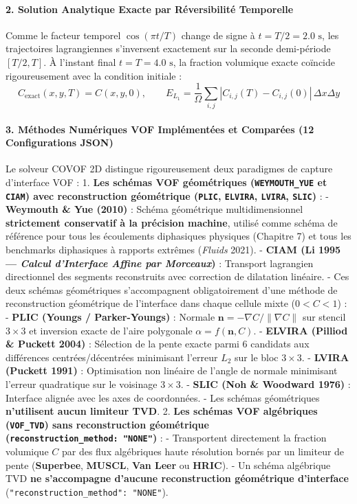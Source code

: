 \documentclass[
  10pt,
]{article}
\begin{document}
\paragraph{2. Solution Analytique Exacte par Réversibilité
Temporelle}\label{solution-analytique-exacte-par-ruxe9versibilituxe9-temporelle}

Comme le facteur temporel \(\cos(\pi t / T)\) change de signe à
\(t = T/2 = 2.0\text{ s}\), les trajectoires lagrangiennes s'inversent
exactement sur la seconde demi-période \([T/2, T]\). À l'instant final
\(t = T = 4.0\text{ s}\), la fraction volumique exacte coïncide
rigoureusement avec la condition initiale :
\[C_{\text{exact}}(x, y, T) = C(x, y, 0), \qquad E_{L_1} = \frac{1}{\Omega} \sum_{i,j} |C_{i,j}(T) - C_{i,j}(0)| \, \Delta x \Delta y\]

\paragraph{3. Méthodes Numériques VOF Implémentées et Comparées (12
Configurations
JSON)}\label{muxe9thodes-numuxe9riques-vof-impluxe9mentuxe9es-et-comparuxe9es-12-configurations-json}

Le solveur COVOF 2D distingue rigoureusement deux paradigmes de capture
d'interface VOF : 1. \textbf{Les schémas VOF géométriques
(\texttt{WEYMOUTH\_YUE} et \texttt{CIAM}) avec reconstruction
géométrique (\texttt{PLIC}, \texttt{ELVIRA}, \texttt{LVIRA},
\texttt{SLIC})} : - \textbf{Weymouth \& Yue (2010)} : Schéma géométrique
multidimensionnel \textbf{strictement conservatif à la précision
machine}, utilisé comme schéma de référence pour tous les écoulements
diphasiques physiques (Chapitre 7) et tous les benchmarks diphasiques à
rapports extrêmes (\emph{Fluids} 2021). - \textbf{CIAM (Li 1995 ---
\emph{Calcul d'Interface Affine par Morceaux})} : Transport lagrangien
directionnel des segments reconstruits avec correction de dilatation
linéaire. - Ces deux schémas géométriques s'accompagnent obligatoirement
d'une méthode de reconstruction géométrique de l'interface dans chaque
cellule mixte (\(0 < C < 1\)) : - \textbf{PLIC (Youngs / Parker-Youngs)}
: Normale \(\mathbf{n} = -\nabla C / \|\nabla C\|\) sur stencil
\(3\times 3\) et inversion exacte de l'aire polygonale
\(\alpha = f(\mathbf{n}, C)\). - \textbf{ELVIRA (Pilliod \& Puckett
2004)} : Sélection de la pente exacte parmi 6 candidats aux différences
centrées/décentrées minimisant l'erreur \(L_2\) sur le bloc
\(3\times 3\). - \textbf{LVIRA (Puckett 1991)} : Optimisation non
linéaire de l'angle de normale minimisant l'erreur quadratique sur le
voisinage \(3\times 3\). - \textbf{SLIC (Noh \& Woodward 1976)} :
Interface alignée avec les axes de coordonnées. - Les schémas
géométriques \textbf{n'utilisent aucun limiteur TVD}. 2. \textbf{Les
schémas VOF algébriques (\texttt{VOF\_TVD}) sans reconstruction
géométrique (\texttt{reconstruction\_method:\ "NONE"})} : - Transportent
directement la fraction volumique \(C\) par des flux algébriques haute
résolution bornés par un limiteur de pente (\textbf{Superbee},
\textbf{MUSCL}, \textbf{Van Leer} ou \textbf{HRIC}). - Un schéma
algébrique TVD \textbf{ne s'accompagne d'aucune reconstruction
géométrique d'interface} (\texttt{"reconstruction\_method":\ "NONE"}).
\end{document}

